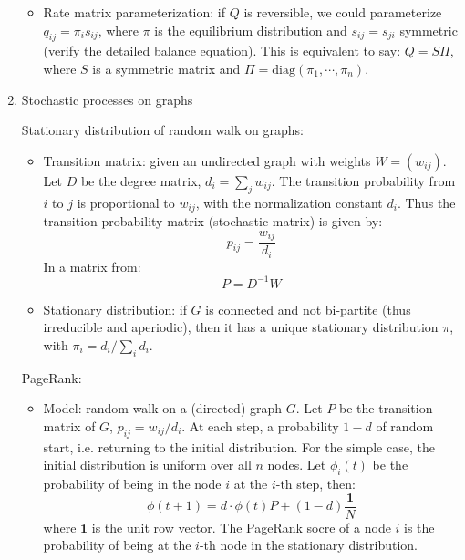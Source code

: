 \documentclass{report}
\begin{document}
\begin{enumerate}
\begin{itemize}
\item Rate matrix parameterization: if $Q$ is reversible, we could parameterize $q_{ij} = \pi_i s_{ij}$, where $\pi$ is the equilibrium distribution and $s_{ij} = s_{ji}$ symmetric (verify the detailed balance equation). This is equivalent to say: $Q = S \Pi$, where $S$ is a symmetric matrix and $\Pi = \text{diag}(\pi_1, \cdots, \pi_n)$.   
\end{itemize}

\item{Stochastic processes on graphs}

Stationary distribution of random walk on graphs: 
\begin{itemize}
\item Transition matrix: given an undirected graph with weights $W = (w_{ij})$. Let $D$ be the degree matrix, $d_i = \sum_j w_{ij}$. The transition probability from $i$ to $j$ is proportional to $w_{ij}$, with the normalization constant $d_i$. Thus the transition probability matrix (stochastic matrix) is given by: 
\begin{equation}
p_{ij} = \frac{w_{ij}}{d_i}	
\end{equation}
In a matrix from: 
\begin{equation}
P = D^{-1} W	
\end{equation}

\item Stationary distribution: if $G$ is connected and not bi-partite (thus irreducible and aperiodic), then it has a unique stationary distribution $\pi$, with $\pi_i = d_i / \sum_i d_i$. 

\end{itemize}

PageRank: 
\begin{itemize}
\item Model: random walk on a (directed) graph $G$. Let $P$ be the transition matrix of $G$, $p_{ij} = w_{ij} / d_i$. At each step, a probability $1 - d$ of random start, i.e. returning to the initial distribution. For the simple case, the initial distribution is uniform over all $n$ nodes. Let $\phi_i(t)$ be the probability of being in the node $i$ at the $i$-th step, then: 
\begin{equation}
\phi(t+1) = d \cdot \phi(t) P + (1 - d) \frac{\mathbf{1}}{N} 	
\end{equation}
where $\mathbf{1}$ is the unit row vector. The PageRank socre of a node $i$ is the probability of being at the $i$-th node in the stationary distribution. 
\end{itemize}


\end{enumerate}
\end{document}
